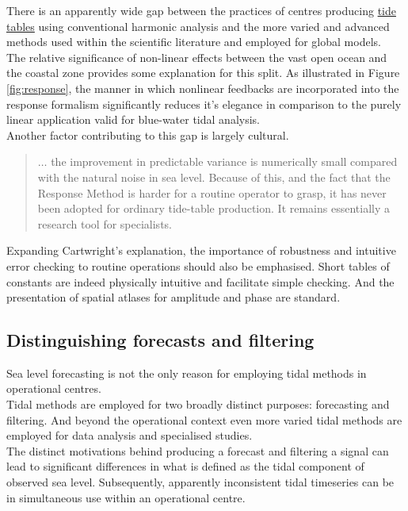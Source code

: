There is an apparently wide gap between the practices of centres producing \underline{tide tables} using conventional harmonic analysis and the more varied and advanced methods used within the scientific literature and employed for global models.\\
The relative significance of non-linear effects between the vast open ocean and the coastal zone provides some explanation for this split.  As illustrated in Figure \ref{fig:response}, the manner in which nonlinear feedbacks are incorporated into the response formalism significantly reduces it's elegance in comparison to the purely linear application valid for blue-water tidal analysis.\\
Another factor contributing to this gap is largely cultural.
\begin{quotation}
$\dots$ the improvement in predictable variance is numerically small compared with the natural noise in sea level.   Because of this, and the fact that the Response Method is harder for a routine operator to grasp, it has never been adopted for ordinary tide-table production. It remains essentially a research tool for specialists. \citep[pp 198]{Cartwright:2000tt} 
\end{quotation}
Expanding Cartwright's explanation, the importance of robustness and intuitive error checking to routine operations should also be emphasised.  Short tables of constants are indeed physically intuitive and facilitate simple checking.   And the presentation of spatial atlases for amplitude and phase are standard.





\subsection{Distinguishing forecasts and filtering}

Sea level forecasting is not the only reason for employing tidal methods in operational centres.\\
Tidal methods are employed for two broadly distinct purposes: forecasting and filtering.  And beyond the operational context even more varied tidal methods are employed for data analysis and specialised studies.\\

The distinct motivations behind producing a forecast and filtering a signal can lead to significant differences in what is defined as the tidal component of observed sea level.   Subsequently, apparently inconsistent tidal timeseries can be in simultaneous use within an operational centre.



